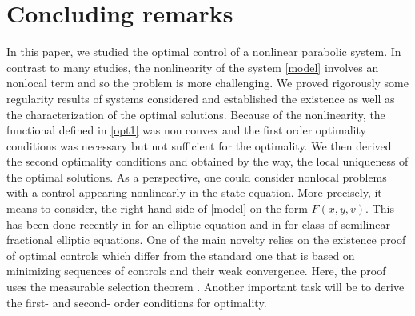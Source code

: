 \documentclass[reqno,twoside]{amsart}
\numberwithin{equation}{section}
\theoremstyle{definition}
\numberwithin{equation}{section}
\begin{document}
\section{Concluding remarks}
\label{conclusion}
In this paper, we studied the optimal control of a nonlinear parabolic system. In contrast to many studies, the  nonlinearity of the system \eqref{model} involves an nonlocal term and so the problem is more challenging. We proved rigorously some regularity results of systems considered and established the existence as well as the characterization of the optimal solutions. Because of the nonlinearity, the functional defined in \eqref{opt1} was non convex and the first order optimality conditions was necessary but not sufficient for the optimality. We then derived the second optimality conditions and obtained by the way, the local uniqueness of the optimal solutions. As a perspective, one could consider nonlocal problems with a control appearing nonlinearly in the state equation. More precisely, it means to consider, the right hand side of \eqref{model} on the form $F(x,y,v)$. This has been done recently in \cite{casas2020o} for an elliptic equation and in \cite{kmw2023frac} for class of semilinear fractional elliptic equations. One of the main novelty relies on the existence proof of optimal controls which differ from the standard one that is based on minimizing sequences of controls and their weak convergence. Here, the proof uses the measurable selection theorem \cite{aubin2009}. Another important task will be to derive the first- and second- order conditions for optimality.

\appendix
\renewcommand{\thesection}{A} 
\renewcommand{\theequation}{A.\arabic{equation}}    

\setcounter{equation}{0}  %
\end{document}

